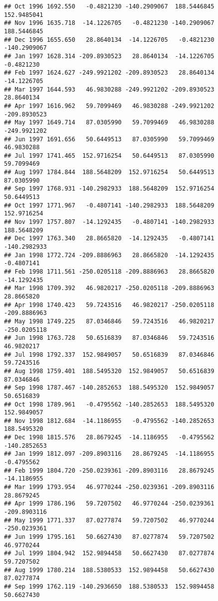 \documentclass[]{article}
\begin{document}
\begin{verbatim}
## Oct 1996 1692.550   -0.4821230 -140.2909067  188.5446845  152.9485041
## Nov 1996 1635.718  -14.1226705   -0.4821230 -140.2909067  188.5446845
## Dec 1996 1655.650   28.8640134  -14.1226705   -0.4821230 -140.2909067
## Jan 1997 1628.314 -209.8930523   28.8640134  -14.1226705   -0.4821230
## Feb 1997 1624.627 -249.9921202 -209.8930523   28.8640134  -14.1226705
## Mar 1997 1644.593   46.9830288 -249.9921202 -209.8930523   28.8640134
## Apr 1997 1616.962   59.7099469   46.9830288 -249.9921202 -209.8930523
## May 1997 1649.714   87.0305990   59.7099469   46.9830288 -249.9921202
## Jun 1997 1691.656   50.6449513   87.0305990   59.7099469   46.9830288
## Jul 1997 1741.465  152.9716254   50.6449513   87.0305990   59.7099469
## Aug 1997 1784.844  188.5648209  152.9716254   50.6449513   87.0305990
## Sep 1997 1768.931 -140.2982933  188.5648209  152.9716254   50.6449513
## Oct 1997 1771.967   -0.4807141 -140.2982933  188.5648209  152.9716254
## Nov 1997 1757.807  -14.1292435   -0.4807141 -140.2982933  188.5648209
## Dec 1997 1763.340   28.8665820  -14.1292435   -0.4807141 -140.2982933
## Jan 1998 1772.724 -209.8886963   28.8665820  -14.1292435   -0.4807141
## Feb 1998 1711.561 -250.0205118 -209.8886963   28.8665820  -14.1292435
## Mar 1998 1709.392   46.9820217 -250.0205118 -209.8886963   28.8665820
## Apr 1998 1740.423   59.7243516   46.9820217 -250.0205118 -209.8886963
## May 1998 1749.225   87.0346846   59.7243516   46.9820217 -250.0205118
## Jun 1998 1763.728   50.6516839   87.0346846   59.7243516   46.9820217
## Jul 1998 1792.337  152.9849057   50.6516839   87.0346846   59.7243516
## Aug 1998 1759.401  188.5495320  152.9849057   50.6516839   87.0346846
## Sep 1998 1787.467 -140.2852653  188.5495320  152.9849057   50.6516839
## Oct 1998 1789.961   -0.4795562 -140.2852653  188.5495320  152.9849057
## Nov 1998 1812.684  -14.1186955   -0.4795562 -140.2852653  188.5495320
## Dec 1998 1815.576   28.8679245  -14.1186955   -0.4795562 -140.2852653
## Jan 1999 1812.097 -209.8903116   28.8679245  -14.1186955   -0.4795562
## Feb 1999 1804.720 -250.0239361 -209.8903116   28.8679245  -14.1186955
## Mar 1999 1793.954   46.9770244 -250.0239361 -209.8903116   28.8679245
## Apr 1999 1786.196   59.7207502   46.9770244 -250.0239361 -209.8903116
## May 1999 1771.337   87.0277874   59.7207502   46.9770244 -250.0239361
## Jun 1999 1795.161   50.6627430   87.0277874   59.7207502   46.9770244
## Jul 1999 1804.942  152.9894458   50.6627430   87.0277874   59.7207502
## Aug 1999 1780.214  188.5380533  152.9894458   50.6627430   87.0277874
## Sep 1999 1762.119 -140.2936650  188.5380533  152.9894458   50.6627430

\end{verbatim}
\end{document}
